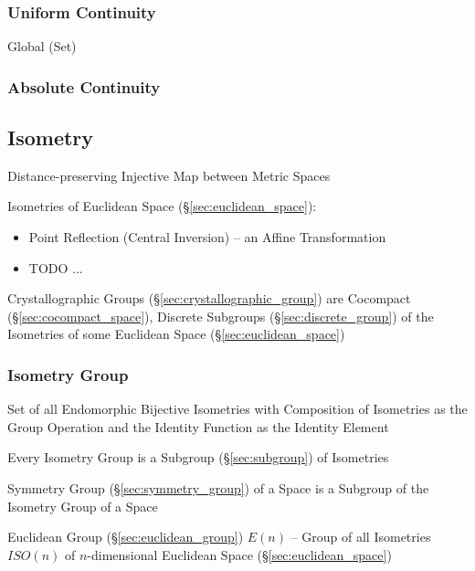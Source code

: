 \subsubsection{Uniform Continuity}\label{sec:uniform_continuity}

Global (Set)



\subsubsection{Absolute Continuity}\label{sec:absolute_contunuity}



\subsection{Isometry}\label{sec:isometry}

Distance-preserving Injective Map between Metric Spaces

Isometries of Euclidean Space (\S\ref{sec:euclidean_space}):
\begin{itemize}
  \item Point Reflection (Central Inversion) -- an Affine Transformation
  \item TODO
  ...
\end{itemize}

Crystallographic Groups (\S\ref{sec:crystallographic_group}) are Cocompact
(\S\ref{sec:cocompact_space}), Discrete Subgroups (\S\ref{sec:discrete_group})
of the Isometries of some Euclidean Space (\S\ref{sec:euclidean_space})



\subsubsection{Isometry Group}\label{sec:isometry_group}

Set of all Endomorphic Bijective Isometries with Composition of
Isometries as the Group Operation and the Identity Function as the
Identity Element

Every Isometry Group is a Subgroup (\S\ref{sec:subgroup}) of Isometries

Symmetry Group (\S\ref{sec:symmetry_group}) of a Space is a Subgroup
of the Isometry Group of a Space

Euclidean Group (\S\ref{sec:euclidean_group}) $E(n)$ -- Group of all
Isometries $ISO(n)$ of $n$-dimensional Euclidean Space
(\S\ref{sec:euclidean_space})

